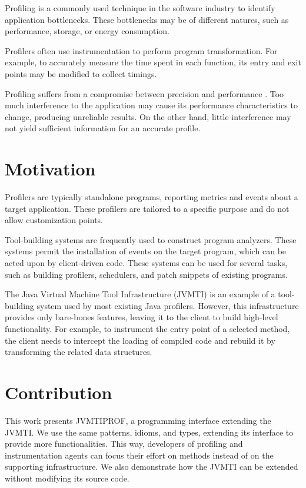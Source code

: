 \label{cap:introduction}

Profiling is a commonly used technique in the software industry to identify application bottlenecks. These bottlenecks may be of different natures, such as performance, storage, or energy consumption.

Profilers often use instrumentation to perform program transformation. For example, to accurately measure the time spent in each function, its entry and exit points may be modified to collect timings.

Profiling suffers from a compromise between precision and performance \cite{ponder1988inaccuracies}. Too much interference to the application may cause its performance characteristics to change, producing unreliable results. On the other hand, little interference may not yield sufficient information for an accurate profile.

\section{Motivation}

Profilers are typically standalone programs, reporting metrics and events about a target application. These profilers are tailored to a specific purpose and do not allow customization points.

Tool-building systems are frequently used to construct program analyzers. These systems permit the installation of events on the target program, which can be acted upon by client-driven code. These systems can be used for several tasks, such as building profilers, schedulers, and patch snippets of existing programs.

The Java Virtual Machine Tool Infrastructure (JVMTI) is an example of a tool-building system used by most existing Java profilers. However, this infrastructure provides only bare-bones features, leaving it to the client to build high-level functionality. For example, to instrument the entry point of a selected method, the client needs to intercept the loading of compiled code and rebuild it by transforming the related data structures.

\section{Contribution}

This work presents JVMTIPROF, a programming interface extending the JVMTI. We use the same patterns, idioms, and types, extending its interface to provide more functionalities. This way, developers of profiling and instrumentation agents can focus their effort on methods instead of on the supporting infrastructure. We also demonstrate how the JVMTI can be extended without modifying its source code.

